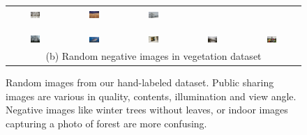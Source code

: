\begin{figure}[th]
{{\begin{center}
\begin{tabular}{@{}c@{\,\,\,}c@{\,\,\,}c@{\,\,\,}c@{\,\,\,}c@{\,\,\,}}
\includegraphics[width=0.19\textwidth]{imggrid/datasetnega/3.jpg} &
\includegraphics[width=0.19\textwidth]{imggrid/datasetnega/4.jpg} &
\includegraphics[width=0.19\textwidth]{imggrid/datasetnega/5.jpg} \\
\\[-6pt]
\hline
\\[-6pt]
\includegraphics[width=0.19\textwidth]{imggrid/datasetnega/1.jpg} &
\includegraphics[width=0.19\textwidth]{imggrid/datasetnega/7.jpg} &
\includegraphics[width=0.19\textwidth]{imggrid/datasetnega/8.jpg} &
\includegraphics[width=0.19\textwidth]{imggrid/datasetnega/2.jpg} &
\includegraphics[width=0.19\textwidth]{imggrid/datasetnega/10.jpg} \\
\multicolumn{5}{c}{(b) Random negative images in vegetation dataset} \\
\end{tabular}
\end{center}
}}
\caption{Random images from our hand-labeled dataset. Public sharing images are various in quality, contents, illumination and view angle.
Negative images like winter trees without leaves, or indoor images capturing a photo of forest are more confusing.}
\label{fig:dataset}
\end{figure}
